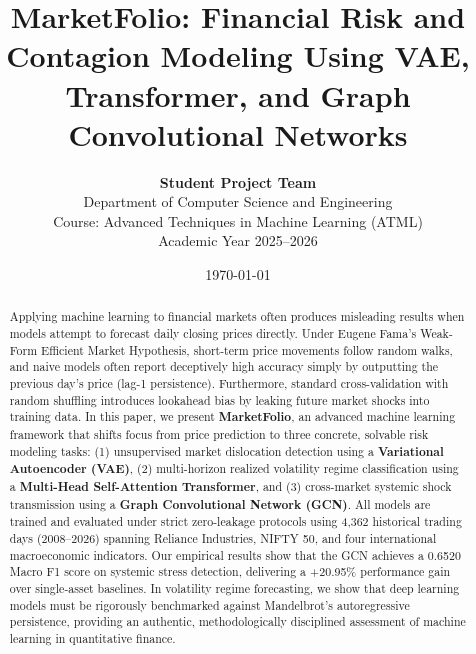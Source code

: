 \documentclass[10pt,twocolumn,letterpaper]{article}
\title{\textbf{MarketFolio: Financial Risk and Contagion Modeling Using VAE, Transformer, and Graph Convolutional Networks}}
\author{
    \textbf{Student Project Team} \\
    Department of Computer Science and Engineering \\
    Course: Advanced Techniques in Machine Learning (ATML) \\
    Academic Year 2025--2026
}
\date{\today}
\begin{document}
\maketitle

\begin{abstract}
Applying machine learning to financial markets often produces misleading results when models attempt to forecast daily closing prices directly. Under Eugene Fama's Weak-Form Efficient Market Hypothesis, short-term price movements follow random walks, and naive models often report deceptively high accuracy simply by outputting the previous day's price (lag-1 persistence). Furthermore, standard cross-validation with random shuffling introduces lookahead bias by leaking future market shocks into training data. In this paper, we present \textbf{MarketFolio}, an advanced machine learning framework that shifts focus from price prediction to three concrete, solvable risk modeling tasks: (1) unsupervised market dislocation detection using a \textbf{Variational Autoencoder (VAE)}, (2) multi-horizon realized volatility regime classification using a \textbf{Multi-Head Self-Attention Transformer}, and (3) cross-market systemic shock transmission using a \textbf{Graph Convolutional Network (GCN)}. All models are trained and evaluated under strict zero-leakage protocols using 4,362 historical trading days (2008--2026) spanning Reliance Industries, NIFTY 50, and four international macroeconomic indicators. Our empirical results show that the GCN achieves a 0.6520 Macro F1 score on systemic stress detection, delivering a +20.95\% performance gain over single-asset baselines. In volatility regime forecasting, we show that deep learning models must be rigorously benchmarked against Mandelbrot's autoregressive persistence, providing an authentic, methodologically disciplined assessment of machine learning in quantitative finance.
\end{abstract}
\end{document}
